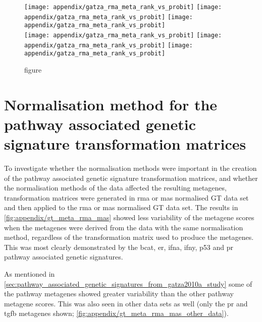 \begin{appendices}
	\begin{figure}[htpb]
		\ContinuedFloat
		\captionsetup{list=off,format=cont}
		\centering
		\texttt{[image: appendix/gatza\_rma\_meta\_rank\_vs\_probit]}
		\texttt{[image: appendix/gatza\_rma\_meta\_rank\_vs\_probit]}
		\texttt{[image: appendix/gatza\_rma\_meta\_rank\_vs\_probit]}\\
		\texttt{[image: appendix/gatza\_rma\_meta\_rank\_vs\_probit]}
		\texttt{[image: appendix/gatza\_rma\_meta\_rank\_vs\_probit]}
		\texttt{[image: appendix/gatza\_rma\_meta\_rank\_vs\_probit]}\\
		\vspace{1em}
		\caption[]{figure}
	\end{figure}

	\section{Normalisation method for the pathway associated genetic signature transformation matrices}
	\label{sec:normalisation_method_for_pathway_associated_genetic_signature_transformation_matrices}

	To investigate whether the normalisation methods were important in the creation of the pathway associated genetic signature transformation matrices, and whether the normalisation methods of the data affected the resulting metagenes, transformation matrices were generated in \gls{rma} or \gls{mas} normalised GT data set and then applied to the \gls{rma} or \gls{mas} normalised GT data set.
	The results in \cref{fig:appendix/gt_meta_rma_mas} showed less variability of the metagene scores when the metagenes were derived from the data with the same normalisation method, regardless of the transformation matrix used to produce the metagenes.
	This was most clearly demonstrated by the \gls{bcat}, \gls{er}, \gls{ifna}, \gls{ifny}, p53 and \gls{pr} pathway associated genetic signatures.

	As mentioned in \cref{sec:pathway_associated_genetic_signatures_from_gatza2010a_study} some of the pathway metagenes showed greater variability than the other pathway metagene scores.
	This was also seen in other data sets as well (only the \gls{pr} and \gls{tgfb} metagenes shown; \cref{fig:appendix/gt_meta_rma_mas_other_data}).


\end{appendices}

